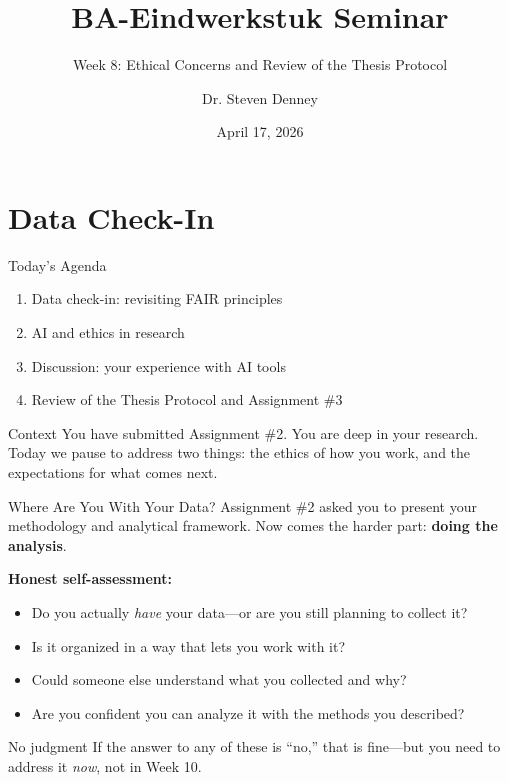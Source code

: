 \documentclass[aspectratio=169,11pt]{beamer}
\title{BA-Eindwerkstuk Seminar}
\subtitle{Week 8: Ethical Concerns and Review of the Thesis Protocol}
\author{Dr. Steven Denney}
\institute{Korean Studies \\ Leiden University}
\date{April 17, 2026}
\begin{document}
\begin{frame}
    \titlepage
\end{frame}

\section{Data Check-In}

\begin{frame}{Today's Agenda}
    \begin{enumerate}
        \item Data check-in: revisiting FAIR principles
        \item AI and ethics in research
        \item Discussion: your experience with AI tools
        \item Review of the Thesis Protocol and Assignment \#3
    \end{enumerate}
    \vspace{0.5cm}
    \begin{block}{Context}
        You have submitted Assignment \#2. You are deep in your research. Today we pause to address two things: the ethics of how you work, and the expectations for what comes next.
    \end{block}
\end{frame}

\begin{frame}{Where Are You With Your Data?}
    Assignment \#2 asked you to present your methodology and analytical framework. Now comes the harder part: \textbf{doing the analysis}.
    \vspace{0.5cm}

    \textbf{Honest self-assessment:}
    \begin{itemize}
        \item Do you actually \textit{have} your data---or are you still planning to collect it?
        \item Is it organized in a way that lets you work with it?
        \item Could someone else understand what you collected and why?
        \item Are you confident you can analyze it with the methods you described?
    \end{itemize}
    \vspace{0.3cm}
    \begin{alertblock}{No judgment}
        If the answer to any of these is ``no,'' that is fine---but you need to address it \textit{now}, not in Week 10.
    \end{alertblock}
\end{frame}
\end{document}
